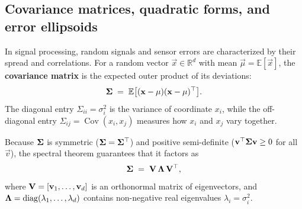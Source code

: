 \subsection{Covariance matrices, quadratic forms, and error ellipsoids}
\label{ch42:covariance}

In signal processing, random signals and sensor errors are characterized by their spread and
correlations. For a random vector $\vec{x} \in \mathbb{R}^d$ with mean $\vec{\mu} = \mathbb{E}[\vec{x}]$,
the \textbf{covariance matrix} is the expected outer product of its deviations:
\begin{equation}
\label{ch42:eq-cov-def}
  \mathbf{\Sigma} \;=\; \mathbb{E}\big[(\mathbf{x}-\mathbf{\mu})(\mathbf{x}-\mathbf{\mu})^\top\big].
\end{equation}
The diagonal entry $\Sigma_{ii} = \sigma_i^2$ is the variance of coordinate $x_i$, while the off-diagonal
entry $\Sigma_{ij} = \operatorname{Cov}(x_i, x_j)$ measures how $x_i$ and $x_j$ vary together.

Because $\mathbf{\Sigma}$ is symmetric ($\mathbf{\Sigma} = \mathbf{\Sigma}^\top$) and positive semi-definite
($\mathbf{v}^\top\mathbf{\Sigma}\mathbf{v} \ge 0$ for all $\vec{v}$), the spectral theorem guarantees that
it factors as
\begin{equation}
\label{ch42:eq-cov-spectral}
  \mathbf{\Sigma} \;=\; \mathbf{V}\,\mathbf{\Lambda}\,\mathbf{V}^\top,
\end{equation}
where $\mathbf{V} = [\mathbf{v}_1, \dots, \mathbf{v}_d]$ is an orthonormal matrix of eigenvectors, and
$\mathbf{\Lambda} = \operatorname{diag}(\lambda_1, \dots, \lambda_d)$ contains non-negative real eigenvalues
$\lambda_i = \sigma_i^2$.

